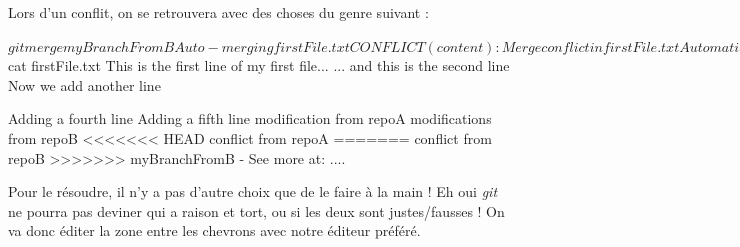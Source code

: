 \documentclass[12pt,a4paper]{article}
\begin{document}

Lors d'un conflit, on se retrouvera avec des choses du genre suivant :

{
\begin{boxedverbatim}
$ git merge myBranchFromB
Auto-merging firstFile.txt
CONFLICT (content): Merge conflict in firstFile.txt
Automatic merge failed; fix conflicts and then commit the result.
$ cat firstFile.txt
This is the first line of my first file...
... and this is the second line
Now we add another line
 
Adding a fourth line
Adding a fifth line
modification from repoA
modifications from repoB
<<<<<<< HEAD
conflict from repoA
=======
conflict from repoB
>>>>>>> myBranchFromB
- See more at: ....
\end{boxedverbatim}
}


Pour le résoudre, il n'y a pas d'autre choix que de le faire à la main ! Eh oui \emph{git} ne pourra pas deviner qui a raison et tort, ou si les deux sont justes/fausses ! On va donc éditer la zone entre les chevrons avec notre éditeur préféré.

\newpage 
\end{document}
